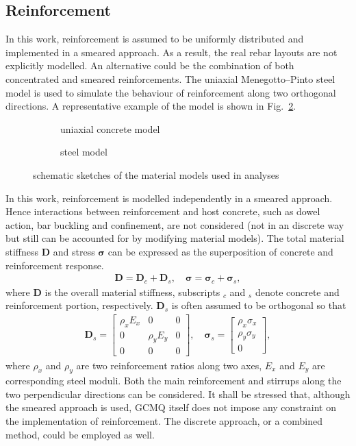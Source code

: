 \documentclass[3p,review,sort&compress,11pt,fleqn]{elsarticle}
\newcommand*{\figref}[1]{Fig.~\ref{#1}}
\newcommand*{\mathbold}{\bm}
\begin{document}
\subsection{Reinforcement}
In this work, reinforcement is assumed to be uniformly distributed and implemented in a smeared approach. As a result, the real rebar layouts are not explicitly modelled. An alternative could be the combination of both concentrated and smeared reinforcements. The uniaxial Menegotto--Pinto steel model \citep{Menegotto1973} is used to simulate the behaviour of reinforcement along two orthogonal directions. A representative example of the model is shown in \figref{fig:steel}.
\begin{figure}[htb]
\centering\scriptsize
\begin{subfigure}[b]{.48\textwidth}\centering

\caption{uniaxial concrete model}\label{fig:concrete}
\end{subfigure}\quad
\begin{subfigure}[b]{.48\textwidth}\centering

\caption{steel model}\label{fig:steel}
\end{subfigure}
\caption{schematic sketches of the material models used in analyses}\label{fig:material}
\end{figure}

In this work, reinforcement is modelled independently in a smeared approach. Hence interactions between reinforcement and host concrete, such as dowel action, bar buckling and confinement, are not considered (not in an discrete way but still can be accounted for by modifying material models). The total material stiffness $\mathbold{D}$ and stress $\mathbold{\sigma}$ can be expressed as the superposition of concrete and reinforcement response.
\begin{gather}
\mathbold{D}=\mathbold{D}_c+\mathbold{D}_s,\quad
\mathbold{\sigma}=\mathbold{\sigma}_c+\mathbold{\sigma}_s,
\end{gather}
where $\mathbold{D}$ is the overall material stiffness, subscripts $_c$ and $_s$ denote concrete and reinforcement portion, respectively. $\mathbold{D}_s$ is often assumed to be orthogonal so that
\begin{gather}
\mathbold{D}_s=\begin{bmatrix}
	\rho_xE_x & 0         & 0 \\
	0         & \rho_yE_y & 0 \\
	0         & 0         & 0
\end{bmatrix},\quad
\mathbold{\sigma}_s=\begin{bmatrix}
	\rho_x\sigma_x \\
	\rho_y\sigma_y \\
	0
\end{bmatrix},
\end{gather}
where $\rho_x$ and $\rho_y$ are two reinforcement ratios along two axes, $E_x$ and $E_y$ are corresponding steel moduli. Both the main reinforcement and stirrups along the two perpendicular directions can be considered. It shall be stressed that, although the smeared approach is used, GCMQ itself does not impose any constraint on the implementation of reinforcement. The discrete approach, or a combined method, could be employed as well.
\end{document}
